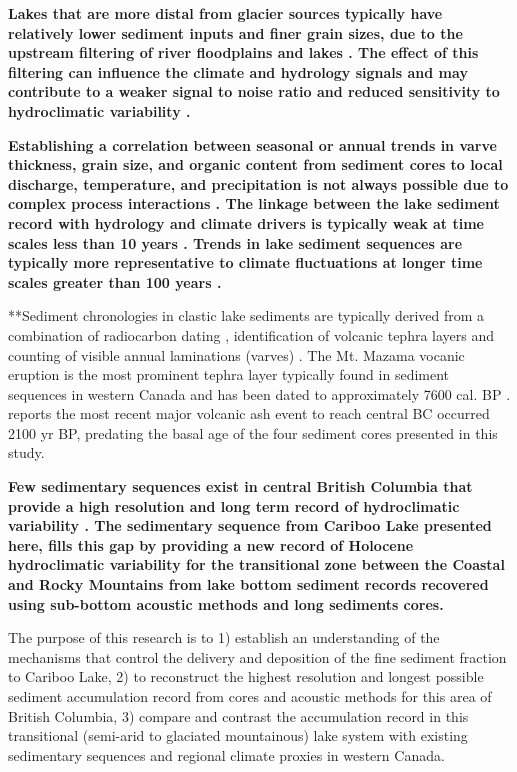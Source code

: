 \documentclass[Royal,times,doublespace,sageh]{sagej}
\begin{document}
\textbf{Lakes that are more distal from glacier sources typically have
relatively lower sediment inputs and finer grain sizes, due to the
upstream filtering of river floodplains and lakes \citep{Hodder2007c}.
The effect of this filtering can influence the climate and hydrology
signals and may contribute to a weaker signal to noise ratio and reduced
sensitivity to hydroclimatic variability \citep{Jerolmack2010}.}

\textbf{Establishing a correlation between seasonal or annual trends in
varve thickness, grain size, and organic content from sediment cores to
local discharge, temperature, and precipitation is not always possible
due to complex process interactions
\citep{Hodder2007c, Menounos2008c, Heideman2017}. The linkage between
the lake sediment record with hydrology and climate drivers is typically
weak at time scales less than 10 years
\citep{Hodder2007c, Menounos2008c, Heideman2017}. Trends in lake
sediment sequences are typically more representative to climate
fluctuations at longer time scales greater than 100 years
\citep{Leonard1999, Osborn2007, Heideman2017}.}

**Sediment chronologies in clastic lake sediments are typically derived
from a combination of radiocarbon dating
\citep{Gilbert2012, Hodder2006b, Steinman2019}, identification of
volcanic tephra layers \citep{Gilbert2012, Hodder2006b, Steinman2019}
and counting of visible annual laminations (varves)
\citep{Hodder2006b, Heideman2015}. The Mt. Mazama vocanic eruption is
the most prominent tephra layer typically found in sediment sequences in
western Canada \citep{Gilbert2012, Steinman2019} and has been dated to
approximately 7600 cal. BP \citep{Zdanowicz1999, Hallett1997}.
\citet{Westgate1977} reports the most recent major volcanic ash event to
reach central BC occurred 2100 yr BP, predating the basal age of the
four sediment cores presented in this study.

\textbf{Few sedimentary sequences exist in central British Columbia that
provide a high resolution and long term record of hydroclimatic
variability
\citep{Gilbert2012, Hodder2006b, Menounos2009b, Maurer2012b}. The
sedimentary sequence from Cariboo Lake presented here, fills this gap by
providing a new record of Holocene hydroclimatic variability for the
transitional zone between the Coastal and Rocky Mountains from lake
bottom sediment records recovered using sub-bottom acoustic methods and
long sediments cores.}

The purpose of this research is to 1) establish an understanding of the
mechanisms that control the delivery and deposition of the fine sediment
fraction to Cariboo Lake, 2) to reconstruct the highest resolution and
longest possible sediment accumulation record from cores and acoustic
methods for this area of British Columbia, 3) compare and contrast the
accumulation record in this transitional (semi-arid to glaciated
mountainous) lake system with existing sedimentary sequences and
regional climate proxies in western Canada.
\end{document}
